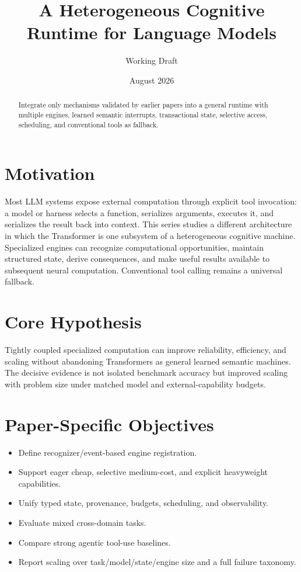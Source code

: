 \documentclass[11pt]{article}
\title{A Heterogeneous Cognitive Runtime for Language Models}
\author{Working Draft}
\date{August 2026}
\begin{document}
\maketitle
\begin{abstract}
Integrate only mechanisms validated by earlier papers into a general runtime with multiple engines, learned semantic interrupts, transactional state, selective access, scheduling, and conventional tools as fallback.
\end{abstract}

\section{Motivation}
Most LLM systems expose external computation through explicit tool invocation: a model or harness selects a function, serializes arguments, executes it, and serializes the result back into context. This series studies a different architecture in which the Transformer is one subsystem of a heterogeneous cognitive machine. Specialized engines can recognize computational opportunities, maintain structured state, derive consequences, and make useful results available to subsequent neural computation. Conventional tool calling remains a universal fallback.

\section{Core Hypothesis}
Tightly coupled specialized computation can improve reliability, efficiency, and scaling without abandoning Transformers as general learned semantic machines. The decisive evidence is not isolated benchmark accuracy but improved scaling with problem size under matched model and external-capability budgets.

\section{Paper-Specific Objectives}
\begin{itemize}
\item Define recognizer/event-based engine registration.
\item Support eager cheap, selective medium-cost, and explicit heavyweight capabilities.
\item Unify typed state, provenance, budgets, scheduling, and observability.
\item Evaluate mixed cross-domain tasks.
\item Compare strong agentic tool-use baselines.
\item Report scaling over task/model/state/engine size and a full failure taxonomy.
\end{itemize}
\end{document}
